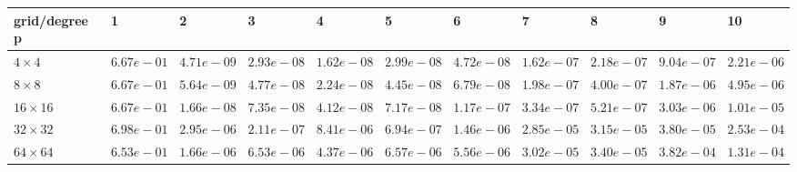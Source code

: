 \begin{tabular}{lllllllllll}
\hline
 grid/degree p   & 1          & 2          & 3          & 4          & 5          & 6          & 7          & 8          & 9          & 10         \\
\hline
 $4 \times 4$    & $6.67e-01$ & $4.71e-09$ & $2.93e-08$ & $1.62e-08$ & $2.99e-08$ & $4.72e-08$ & $1.62e-07$ & $2.18e-07$ & $9.04e-07$ & $2.21e-06$ \\
 $8 \times 8$    & $6.67e-01$ & $5.64e-09$ & $4.77e-08$ & $2.24e-08$ & $4.45e-08$ & $6.79e-08$ & $1.98e-07$ & $4.00e-07$ & $1.87e-06$ & $4.95e-06$ \\
 $16 \times 16$  & $6.67e-01$ & $1.66e-08$ & $7.35e-08$ & $4.12e-08$ & $7.17e-08$ & $1.17e-07$ & $3.34e-07$ & $5.21e-07$ & $3.03e-06$ & $1.01e-05$ \\
 $32 \times 32$  & $6.98e-01$ & $2.95e-06$ & $2.11e-07$ & $8.41e-06$ & $6.94e-07$ & $1.46e-06$ & $2.85e-05$ & $3.15e-05$ & $3.80e-05$ & $2.53e-04$ \\
 $64 \times 64$  & $6.53e-01$ & $1.66e-06$ & $6.53e-06$ & $4.37e-06$ & $6.57e-06$ & $5.56e-06$ & $3.02e-05$ & $3.40e-05$ & $3.82e-04$ & $1.31e-04$ \\
\hline
\end{tabular}